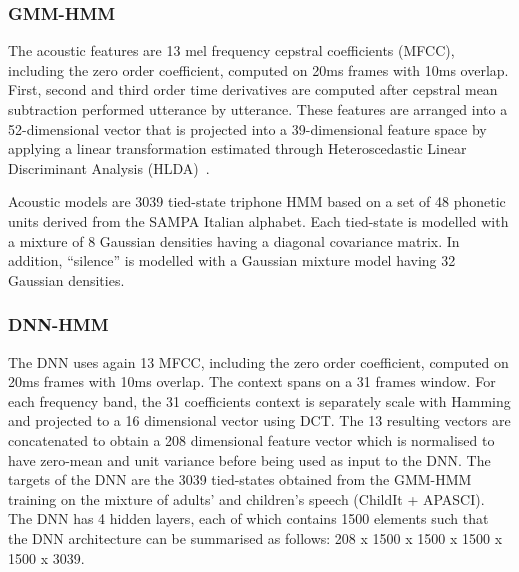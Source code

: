 \documentclass{nle}
\begin{document}
\subsubsection{GMM-HMM}\label{sssection:base}

The  acoustic  features are  13  mel  frequency cepstral  coefficients
(MFCC), including the zero order coefficient, computed on 20ms frames
with 10ms overlap.  First, second and third order time derivatives are
computed  after  cepstral  mean  subtraction  performed  utterance  by
utterance.  These  features are arranged into  a 52-dimensional vector
that is  projected into a  39-dimensional feature space by  applying a
linear   transformation  estimated   through   Heteroscedastic  Linear
Discriminant Analysis (HLDA)~\citep*{Kumar1998283}.

Acoustic models  are 3039 tied-state  triphone HMM
based on  a set of  48 phonetic units  derived from the  SAMPA Italian
alphabet.  Each  tied-state  is modelled with  a mixture of  8 Gaussian
densities   having  a  diagonal   covariance  matrix.    In  addition,
``silence''  is  modelled  with  a  Gaussian mixture  model  having  32
Gaussian densities.

\subsubsection{DNN-HMM}\label{sssection:exp:DNN}
The DNN  uses again  13 MFCC, including  the zero  order coefficient,
computed on 20ms  frames with 10ms overlap. The context  spans on a 31
frames  window. For each frequency band, the 31 coefficients context is separately scale with Hamming and projected to a 16 dimensional vector using DCT. The 13 resulting vectors are concatenated to obtain a 208 dimensional feature  vector which is normalised to have zero-mean and unit variance before being used as input to the DNN. The targets of the
DNN are the 3039 tied-states obtained from the GMM-HMM training on the
mixture of adults'  and children's speech (ChildIt +  APASCI). The DNN
has 4  hidden layers, each of  which contains 1500  elements such that
the DNN architecture can be summarised as follows: 208 x 1500 x 1500 x
1500 x 1500 x 3039.
\end{document}
